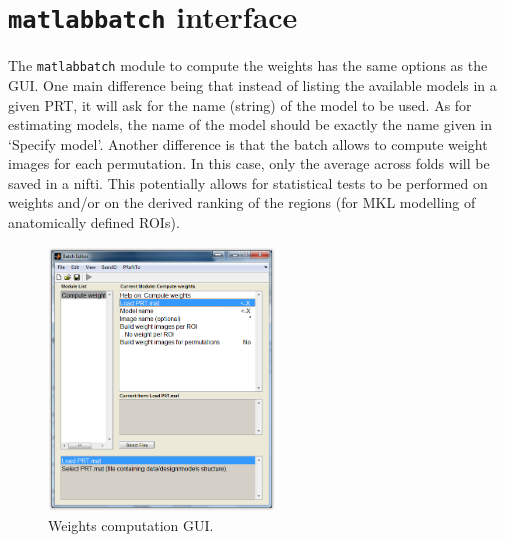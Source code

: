 \section{{\tt matlabbatch} interface}

The {\tt matlabbatch} module to compute the weights has the same options as the GUI. One main difference being that instead of listing the available models in a given PRT, it will ask for the name (string) of the model to be used. As for estimating models, the name of the model should be exactly the name given in `Specify model'. Another difference is that the batch allows to compute weight images for each permutation. In this case, only the average across folds will be saved in a nifti. This potentially allows for statistical tests to be performed on weights and/or on the derived ranking of the regions (for MKL modelling of anatomically defined ROIs).

\begin{figure}[h!]
\begin{center}
	\includegraphics[height=7cm]{images/batchWeights.PNG}
	\caption{Weights computation GUI.}
	\label{batch_CompWeights}
\end{center}
\end{figure}
